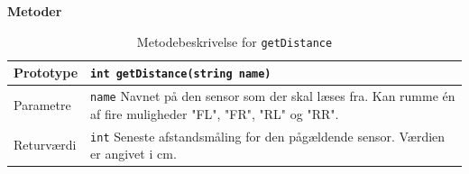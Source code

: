 \textbf{Metoder}

\begin{table}[h]
	\begin{tabularx}{\textwidth}{| L{2.5 cm} | Z |} \hline
		Prototype 	& \texttt{int getDistance(string name)} \\\hline
		Parametre 	& \texttt{name} \newline Navnet på den sensor som der skal læses fra. Kan rumme én af fire muligheder "FL", "FR", "RL" og "RR". \\\hline
		Returværdi 	& \texttt{int} \newline Seneste afstandsmåling for den pågældende sensor. Værdien er angivet i cm. \\\hline
	\end{tabularx}
	\caption{Metodebeskrivelse for \texttt{getDistance}}
	\label{table:met_getdistance}
\end{table}
\clearpage